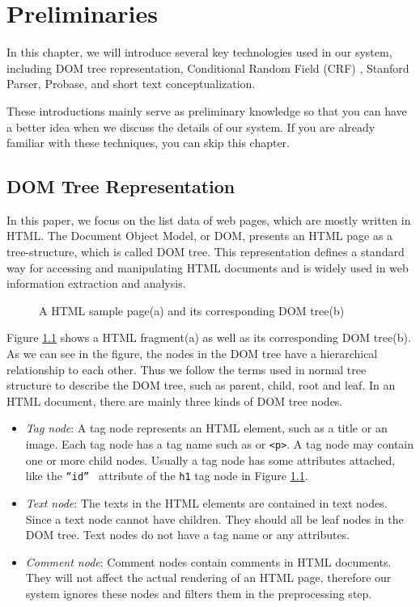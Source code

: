 \chapter{Preliminaries}
\label{sec:prelim}

In this chapter,
we will introduce several key technologies used in our system,
including
DOM tree representation,
Conditional Random Field (CRF) \cite{CRFLafferty},
Stanford Parser\cite{StanfordParser},
Probase\cite{WuLWZ12:Probase},
and short text conceptualization\cite{Song11:Conceptualize}.

These introductions mainly serve as preliminary knowledge so that you can have a better idea
when we discuss the details of our system.
If you are already familiar with these techniques, you can skip this chapter.

\section{DOM Tree Representation}
\label{sec:DOMtree}
In this paper, we focus on the list data of web pages, which are mostly written in HTML.
The Document Object Model, or DOM, presents an HTML page as a tree-structure, which is called DOM tree.
This representation defines a standard way for accessing and manipulating HTML documents
and is widely used in web information extraction and analysis.

\begin{figure}[th]
        \centering
        \caption{A HTML sample page(a) and its corresponding DOM tree(b)}
        \label{fig:DOMTree}
\end{figure}

Figure \ref{fig:DOMTree} shows a HTML fragment(a) as well as its corresponding DOM tree(b).
As we can see in the figure, the nodes in the DOM tree have a hierarchical relationship to each other.
Thus we follow the terms used in normal tree structure to describe the DOM tree, such as parent, child, root and leaf.
In an HTML document, there are mainly three kinds of DOM tree nodes.

\begin{itemize}
  \item \textit{Tag node}:
    A tag node represents an HTML element, such as a title or an image.
    Each tag node has a tag name such as {\tt <h1>} or {\tt <p>}.
    A tag node may contain one or more child nodes.
    Usually a tag node has some attributes attached,
    like the {\tt ``id'' } attribute of the {\tt h1} tag node in Figure \ref{fig:DOMTree}.
  \item \textit{Text node}:
    The texts in the HTML elements are contained in text nodes.
    Since a text node cannot have children.
    They should all be leaf nodes in the DOM tree.
    Text nodes do not have a tag name or any attributes.
  \item \textit{Comment node}:
    Comment nodes contain comments in HTML documents.
    They will not affect the actual rendering of an HTML page,
    therefore our system ignores these nodes and filters them in the preprocessing step.
\end{itemize}


